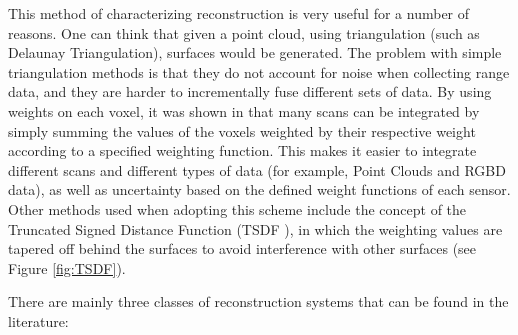 \documentclass[11pt]{article}
\begin{document}
This method of characterizing reconstruction is very useful for a number of reasons. One can think that given a point cloud, using triangulation (such as Delaunay Triangulation), surfaces would be generated. The problem with simple triangulation methods is that they do not account for noise when collecting range data, and they are harder to incrementally fuse different sets of data. By using weights on each voxel, it was shown in \cite{TSDF} that many scans can be integrated by simply summing the values of the voxels weighted by their respective weight according to a specified weighting function. This makes it easier to integrate different scans and different types of data (for example, Point Clouds and RGBD data), as well as uncertainty based on the defined weight functions of each sensor. Other methods used when adopting this scheme include the concept of the Truncated Signed Distance Function (TSDF \cite{TSDF}), in which the weighting values are tapered off behind the surfaces to avoid interference with other surfaces (see Figure \ref{fig:TSDF}).

There are mainly three classes of reconstruction systems that can be found in the literature:
	
\end{document}
